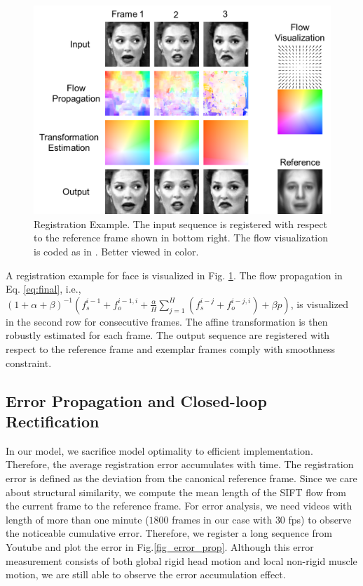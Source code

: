 \documentclass[10pt,journal]{IEEEtran}
\begin{document}
\begin{figure}[htbp]
	\centering
		\includegraphics[width=\columnwidth]{fig/theory_example.png}
	\caption{Registration Example. The input sequence is registered with respect to the reference frame shown in bottom right. The flow visualization is coded as in \cite{Baker_ICCV07}. Better viewed in color.}
	\label{fig_theory_example}
\end{figure}

A registration example for face is visualized in Fig. \ref{fig_theory_example}. The flow propagation in Eq. \ref{eq:final}, i.e., $(1+\alpha+\beta)^{-1}(f_s^{i-1}+f_o^{i-1,i}+\frac{\alpha}{H}\sum_{j=1}^H(f_s^{i-j}+f_o^{i-j,i})+\beta{p})$, is visualized in the second row for consecutive frames. The affine transformation is then robustly estimated for each frame. The output sequence are registered with respect to the reference frame and exemplar frames comply with smoothness constraint. 


\subsection{\label{sec:details}Error Propagation and Closed-loop Rectification}

In our model, we sacrifice model optimality to efficient implementation. Therefore, the average registration error accumulates with time. The registration error is defined as the deviation from the canonical reference frame. Since we care about structural similarity, we compute the mean length of the SIFT flow from the current frame to the reference frame. For error analysis, we need videos with length of more than one minute ($1800$ frames in our case with $30$ fps) to observe the noticeable cumulative error. Therefore, we register a long sequence from Youtube and plot the error in Fig.\ref{fig_error_prop}. Although this error measurement consists of both global rigid head motion and local non-rigid muscle motion, we are still able to observe the error accumulation effect.
\end{document}
